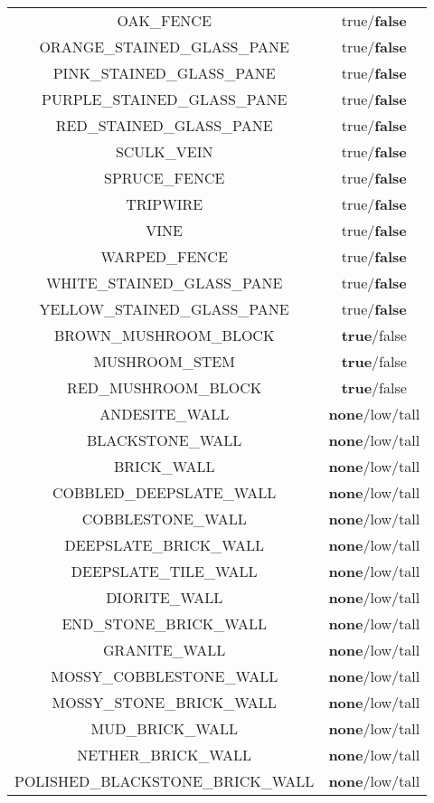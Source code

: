 \begin{longtable}{ |c|c| }
	OAK\_FENCE & true/\textbf{false} \\
	ORANGE\_STAINED\_GLASS\_PANE & true/\textbf{false} \\
	PINK\_STAINED\_GLASS\_PANE & true/\textbf{false} \\
	PURPLE\_STAINED\_GLASS\_PANE & true/\textbf{false} \\
	RED\_STAINED\_GLASS\_PANE & true/\textbf{false} \\
	SCULK\_VEIN & true/\textbf{false} \\
	SPRUCE\_FENCE & true/\textbf{false} \\
	TRIPWIRE & true/\textbf{false} \\
	VINE & true/\textbf{false} \\
	WARPED\_FENCE & true/\textbf{false} \\
	WHITE\_STAINED\_GLASS\_PANE & true/\textbf{false} \\
	YELLOW\_STAINED\_GLASS\_PANE & true/\textbf{false} \\
	\hline
	BROWN\_MUSHROOM\_BLOCK & \textbf{true}/false \\
	MUSHROOM\_STEM & \textbf{true}/false \\
	RED\_MUSHROOM\_BLOCK & \textbf{true}/false \\
	\hline
	ANDESITE\_WALL & \textbf{none}/low/tall \\
	BLACKSTONE\_WALL & \textbf{none}/low/tall \\
	BRICK\_WALL & \textbf{none}/low/tall \\
	COBBLED\_DEEPSLATE\_WALL & \textbf{none}/low/tall \\
	COBBLESTONE\_WALL & \textbf{none}/low/tall \\
	DEEPSLATE\_BRICK\_WALL & \textbf{none}/low/tall \\
	DEEPSLATE\_TILE\_WALL & \textbf{none}/low/tall \\
	DIORITE\_WALL & \textbf{none}/low/tall \\
	END\_STONE\_BRICK\_WALL & \textbf{none}/low/tall \\
	GRANITE\_WALL & \textbf{none}/low/tall \\
	MOSSY\_COBBLESTONE\_WALL & \textbf{none}/low/tall \\
	MOSSY\_STONE\_BRICK\_WALL & \textbf{none}/low/tall \\
	MUD\_BRICK\_WALL & \textbf{none}/low/tall \\
	NETHER\_BRICK\_WALL & \textbf{none}/low/tall \\
	POLISHED\_BLACKSTONE\_BRICK\_WALL & \textbf{none}/low/tall \\

\end{longtable}
